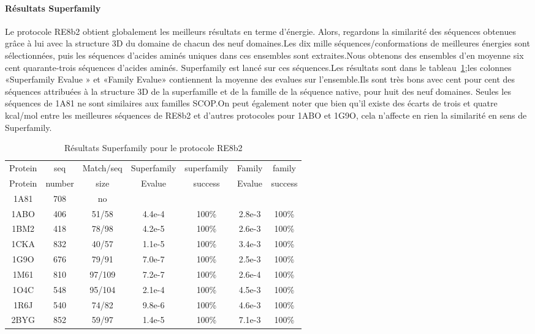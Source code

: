    \paragraph{Résultats Superfamily}
Le protocole RE8b2 obtient globalement les meilleurs résultats en terme d'énergie. Alors, regardons la similarité des séquences obtenues grâce à lui avec la structure 3D du domaine de chacun des neuf domaines.Les dix mille séquences/conformations de meilleures énergies sont sélectionnées, puis les séquences d'acides aminés uniques dans ces ensembles sont extraites.Nous obtenons des ensembles d'en moyenne six cent quarante-trois séquences d'acides aminés. Superfamily est lancé sur ces séquences.Les résultats sont dans le tableau~\ref{tab:superfamily_bestRE};les colonnes «Superfamily Evalue » et «Family Evalue» contiennent la moyenne des evalues sur l'ensemble.Ils sont très bons avec cent pour cent des séquences attribuées à la structure 3D de la superfamille et de la famille de la séquence native, pour huit des neuf domaines. Seules les séquences de 1A81  ne sont similaires aux familles SCOP.On peut également noter que  bien qu'il existe des écarts de trois et quatre kcal/mol entre les meilleures séquences de RE8b2 et d'autres protocoles pour 1ABO et 1G9O, cela n'affecte en rien la similarité en sens de Superfamily.

    \begin{table}[h]
           \raggedleft{}

      \begin{tabular}{ccccccc}

        \toprule
        Protein & seq  & Match/seq & Superfamily & superfamily & Family & family \\
        Protein & number & size & Evalue & success & Evalue &  success\\
        \cmidrule{1-7}
        1A81 & 708 & no & & & & \\
        1ABO & 406 & 51/58  & 4.4e-4 & 100\% & 2.8e-3 & 100\% \\
        1BM2 & 418 & 78/98  & 4.2e-5 & 100\% & 2.6e-3 & 100\% \\
        1CKA & 832 & 40/57  & 1.1e-5 & 100\% & 3.4e-3 & 100\% \\
        1G9O & 676 & 79/91  & 7.0e-7 & 100\% & 2.5e-3 & 100\%  \\
        1M61 & 810 & 97/109 & 7.2e-7 & 100\% & 2.6e-4 &  100\% \\
        1O4C & 548 & 95/104 & 2.1e-4 & 100\% & 4.5e-3 &  100\% \\
        1R6J & 540 & 74/82  & 9.8e-6 & 100\% & 4.6e-3 &  100\% \\
        2BYG & 852 & 59/97  & 1.4e-5 & 100\% & 7.1e-3 &  100\% \\
        \bottomrule        
      \end{tabular}   
     \caption{Résultats Superfamily pour le protocole RE8b2}   
\label{tab:superfamily_bestRE}       
\end{table}


